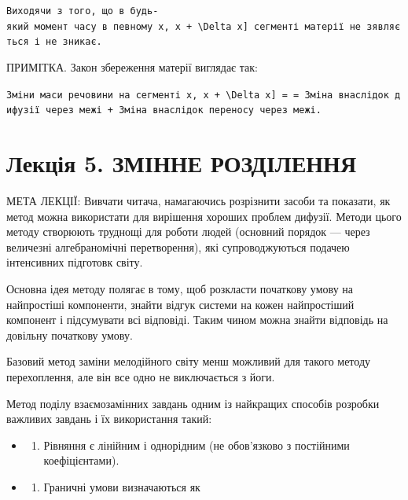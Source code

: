 \documentclass[
  ukrainian,
]{article}
\providecommand{\tightlist}{%
  \setlength{\itemsep}{0pt}\setlength{\parskip}{0pt}}
\begin{document}
\texttt{Виходячи\ з\ того,\ що\ в\ будь-який\ момент\ часу\ в\ певному\ \textquotesingle{}{[}x,\ x\ +\ \textbackslash{}Delta\ x{]}\textquotesingle{}\ сегменті\ матерії\ не\ з\textquotesingle{}являється\ і\ не\ зникає.}

ПРИМІТКА. Закон збереження матерії виглядає так:

\texttt{Зміни\ маси\ речовини\ на\ сегменті\ \textquotesingle{}{[}x,\ x\ +\ \textbackslash{}Delta\ x{]}\ =\textquotesingle{}\ =\ Зміна\ внаслідок\ дифузії\ через\ межі\ +\ Зміна\ внаслідок\ переносу\ через\ межі.}

\section{Лекція 5. ЗМІННЕ
РОЗДІЛЕННЯ}\label{ux43bux435ux43aux446ux456ux44f-5.-ux437ux43cux456ux43dux43dux435-ux440ux43eux437ux434ux456ux43bux435ux43dux43dux44f}

МЕТА ЛЕКЦІЇ: Вивчати читача, намагаючись розрізнити засоби та показати,
як метод можна використати для вирішення хороших проблем дифузії. Методи
цього методу створюють труднощі для роботи людей (основний порядок ---
через величезні алгебраномічні перетворення), які супроводжуються
подачею інтенсивних підготовк світу.

Основна ідея методу полягає в тому, щоб розкласти початкову умову на
найпростіші компоненти, знайти відгук системи на кожен найпростіший
компонент і підсумувати всі відповіді. Таким чином можна знайти
відповідь на довільну початкову умову.

Базовий метод заміни мелодійного світу менш можливий для такого методу
перехоплення, але він все одно не виключається з йоги.

Метод поділу взаємозамінних завдань одним із найкращих способів розробки
важливих завдань і їх використання такий:

\begin{itemize}
\tightlist
\item
  \begin{enumerate}
  \def\labelenumi{\arabic{enumi}.}
  \tightlist
  \item
    Рівняння є лінійним і однорідним (не обов'язково з постійними
    коефіцієнтами).
  \end{enumerate}
\item
  \begin{enumerate}
  \def\labelenumi{\arabic{enumi}.}
  \setcounter{enumi}{1}
  \tightlist
  \item
    Граничні умови визначаються як
  \end{enumerate}
\end{itemize}
\end{document}
